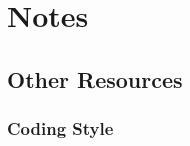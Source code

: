 \documentclass{ltxdoc}
\begin{document}

\section{Notes}

\subsection*{Other Resources}

\subsubsection*{Coding Style}
\end{document}
